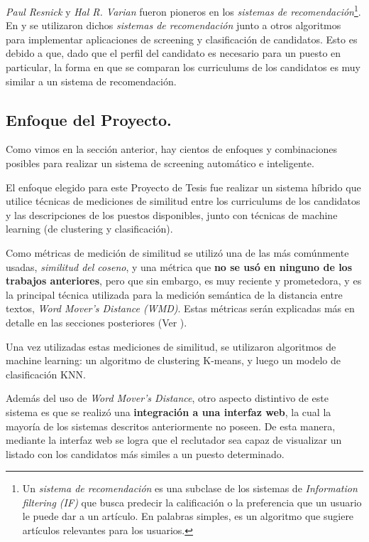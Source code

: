 \documentclass[12pt,a4paper]{article}
\begin{document}
\begin{sloppypar}
\textit{Paul Resnick} y \textit{Hal R. Varian} fueron pioneros en los \textit{sistemas de recomendación}\footnote{Un \textit{sistema de recomendación} es una subclase de los sistemas de \textit{Information filtering (IF)} que busca predecir la calificación o la preferencia que un usuario le puede dar a un artículo. En palabras simples, es un algoritmo que sugiere artículos relevantes para los usuarios.}\cite{sistema_recomendacion}.
En \cite{trabajos_relacionados_14} y \cite{trabajos_relacionados_15} se utilizaron dichos \textit{sistemas de recomendación} junto a otros algoritmos para implementar aplicaciones de screening y clasificación de candidatos. Esto es debido a que, dado que el perfil del candidato es necesario para un puesto en particular, la forma en que se comparan los curriculums de los candidatos es muy similar a un sistema de recomendación. 

\cleardoublepage    %

\subsection{Enfoque del Proyecto.}

Como vimos en la sección anterior, hay cientos de enfoques y combinaciones posibles para realizar un sistema de screening automático e inteligente.

El enfoque elegido para este Proyecto de Tesis fue realizar un sistema híbrido que utilice técnicas de mediciones de similitud entre los curriculums de los candidatos y las descripciones de los puestos disponibles, junto con técnicas de machine learning (de clustering y clasificación). 

Como métricas de medición de similitud se utilizó una de las más comúnmente usadas, \textit{similitud del coseno}, y una métrica que \textbf{no se usó en ninguno de los trabajos anteriores}, pero que sin embargo, es muy reciente y prometedora, y es la principal técnica utilizada para la medición semántica de la distancia entre textos, \textit{Word Mover's Distance (WMD)}. Estas métricas serán explicadas más en detalle en las secciones posteriores (Ver \textit{}).

Una vez utilizadas estas mediciones de similitud, se utilizaron algoritmos de machine learning: un algoritmo de clustering K-means, y luego un modelo de clasificación KNN. 

Además del uso de \textit{Word Mover's Distance}, otro aspecto distintivo de este sistema es que se realizó una \textbf{integración a una interfaz web}, la cual la mayoría de los sistemas descritos anteriormente no poseen. De esta manera, mediante la interfaz web se logra que el reclutador sea capaz de visualizar un listado con los candidatos más similes a un puesto determinado.


\end{sloppypar}
\end{document}
